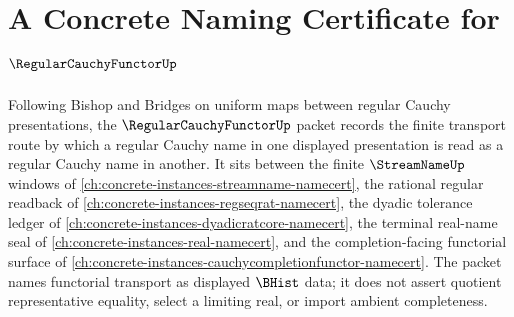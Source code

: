 \chapter{A Concrete Naming Certificate for $\RegularCauchyFunctorUp$}
\label{ch:concrete-instances-regular-cauchy-functor-namecert}

Following Bishop and Bridges on uniform maps between regular Cauchy presentations, the $\RegularCauchyFunctorUp$ packet records the finite transport route by which a regular Cauchy name in one displayed presentation is read as a regular Cauchy name in another. It sits between the finite $\StreamNameUp$ windows of \autoref{ch:concrete-instances-streamname-namecert}, the rational regular readback of \autoref{ch:concrete-instances-regseqrat-namecert}, the dyadic tolerance ledger of \autoref{ch:concrete-instances-dyadicratcore-namecert}, the terminal real-name seal of \autoref{ch:concrete-instances-real-namecert}, and the completion-facing functorial surface of \autoref{ch:concrete-instances-cauchycompletionfunctor-namecert}. The packet names functorial transport as displayed $\BHist$ data; it does not assert quotient representative equality, select a limiting real, or import ambient completeness.

